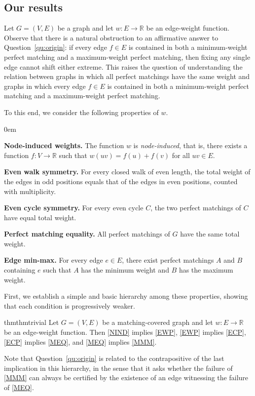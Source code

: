 \documentclass{article}
\newenvironment{symenum}
 {\enumerate[label=\normalfont{(\noexpand\thisenumsymbol)},align=parleft,labelindent=0pt,itemindent=0pt,labelsep=35pt,leftmargin=*]}
 {\endenumerate}
\newcommand\thisenumsymbol{}
\newcommand\itemsymbol[1]{%
  \renewcommand{\thisenumsymbol}{#1}%
  \item
}
\theoremstyle{plain}
\theoremstyle{definition}
\begin{document}
\subsection{Our results}

Let $G=(V,E)$ be a graph and let $w\colon E \to \mathbb{R}$ be an edge-weight function. Observe that there is a natural obstruction to an affirmative answer to Question~\ref{qu:origin}: if every edge $f\in E$ is contained in both a minimum-weight perfect matching and a maximum-weight perfect matching, then fixing any single edge cannot shift either extreme. This raises the question of understanding the relation between graphs in which all perfect matchings have the same weight and graphs in which every edge $f\in E$ is contained in both a minimum-weight perfect matching and a maximum-weight perfect matching. 

To this end, we consider the following properties of $w$.

\begin{symenum}
\itemsep0em
\itemsymbol{IND}\label{NIND} \textbf{Node-induced weights.}
The function $w$ is \emph{node-induced}, that is, there exists a function $f\colon V \to \mathbb{R}$ such that $w(uv)=f(u)+f(v)$ for all $uv\in E$.

\itemsymbol{EWS}\label{EWP} \textbf{Even walk symmetry.}
For every closed walk of even length, the total weight of the edges in odd positions equals that of the edges in even positions, counted with multiplicity.

\itemsymbol{ECS}\label{ECP} \textbf{Even cycle symmetry.}
For every even cycle $C$, the two perfect matchings of $C$ have equal total weight.

\itemsymbol{PME}\label{MEQ} \textbf{Perfect matching equality.}
All perfect matchings of $G$ have the same total weight.

\itemsymbol{EMX}\label{MMM} \textbf{Edge min-max.}
For every edge $e \in E$, there exist perfect matchings $A$ and $B$ containing $e$ such that $A$ has the minimum weight and $B$ has the maximum weight.
\end{symenum}

First, we establish a simple and basic hierarchy among these properties, showing that each condition is progressively weaker.

\begin{restatable}{thm}{thmtrivial}
\label{thm:trivial}
    Let $G=(V,E)$ be a matching-covered graph and let $w\colon E \to \mathbb{R}$ be an edge-weight function. Then \ref{NIND} implies \ref{EWP}, \ref{EWP} implies \ref{ECP}, \ref{ECP} implies \ref{MEQ}, and \ref{MEQ} implies \ref{MMM}.
\end{restatable}
Note that Question~\ref{qu:origin} is related to the contrapositive of the last implication in this hierarchy, in the sense that it asks whether the failure of \ref{MMM} can always be certified by the existence of an edge witnessing the failure of \ref{MEQ}.
\end{document}
